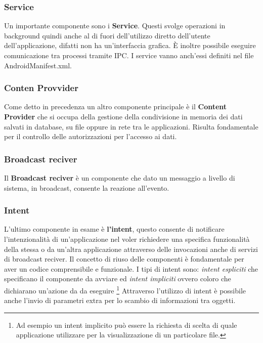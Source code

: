     \subsubsection{Service} Un importante componente sono i \textbf{Service}. Questi svolge operazioni in background quindi anche al di fuori dell'utilizzo diretto dell'utente dell'applicazione, difatti non ha un'interfaccia grafica. È inoltre possibile eseguire comunicazione tra processi tramite IPC. I service vanno anch'essi definiti nel file AndroidManifest.xml.

    \subsubsection{Conten Provvider} Come detto in precedenza un altro componente principale è il \textbf{Content Provider} che si occupa della gestione della condivisione in memoria dei dati salvati in database, su file oppure in rete tra le applicazioni. Risulta fondamentale per il controllo delle autorizzazioni per l'accesso ai dati.
    
    \subsubsection{Broadcast reciver} Il \textbf{Broadcast reciver} è un componente che dato un messaggio a livello di sistema, in broadcast, consente la reazione all'evento. 
    
    \subsubsection{Intent} L'ultimo componente in esame è \textbf{l'intent}, questo consente di notificare l'intenzionalità di un'applicazione nel voler richiedere una specifica funzionalità della stessa o da un'altra applicazione attraverso delle invocazioni anche di servizi di broadcast reciver. Il concetto di riuso delle componenti è fondamentale per aver un codice comprensibile e funzionale. I tipi di intent sono: \textit{intent espliciti} che specificano il componente da avviare ed \textit{intent impliciti} ovvero coloro che dichiarano un'azione da da eseguire \footnote{Ad esempio un intent implicito può essere la richiesta di scelta di quale applicazione utilizzare per la visualizzazione di un particolare file.} Attraverso l'utilizzo di intent è possibile anche l'invio di parametri extra per lo scambio di informazioni tra oggetti. 


